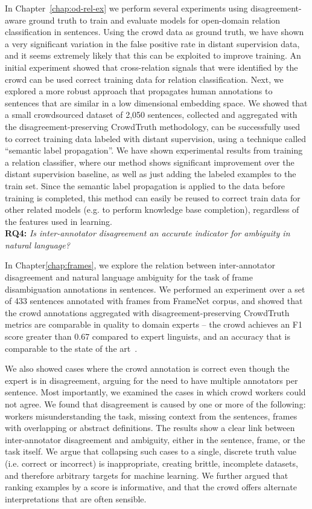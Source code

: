 In Chapter~\ref{chap:od-rel-ex} we perform several experiments using disagreement-aware ground truth to train and evaluate models for open-domain relation classification in sentences. Using the crowd data as ground truth, we have shown a very significant variation in the false positive rate in distant supervision data, and it seems extremely likely that this can be exploited to improve training. An initial experiment showed that cross-relation signals that were identified by the crowd can be used correct training data for relation classification. Next, we explored a more robust approach that propagates human annotations to sentences that are similar in a low dimensional embedding space. We showed that a small crowdsourced dataset of 2,050 sentences, collected and aggregated with the disagreement-preserving CrowdTruth methodology, can be successfully used to correct training data labeled with distant supervision, using a technique called ``semantic label propagation''.  We have shown experimental results from training a relation classifier, where our method shows significant improvement over the distant supervision baseline, as well as just adding the labeled examples to the train set. Since the semantic label propagation is applied to the data before training is completed, this method can easily be reused to correct train data for other related models (e.g. to perform knowledge base completion), regardless of the features used in learning. \\


\textbf{RQ4:} \textit{Is inter-annotator disagreement an accurate indicator for ambiguity in natural language?}

In Chapter\ref{chap:frames}, we explore the relation between inter-annotator disagreement and natural language ambiguity for the task of frame disambiguation annotations in sentences. We performed an experiment over a set of 433 sentences annotated with frames from FrameNet corpus, and showed that the crowd annotations aggregated with disagreement-preserving CrowdTruth metrics are comparable in quality to domain experts -- the crowd achieves an F1 score greater than 0.67 compared to expert linguists, and an accuracy that is comparable to the state of the art~\cite{Hong:2011:GCR:2018966.2018970}.

We also showed cases where the crowd annotation is correct even though the expert is in disagreement, arguing for the need to have multiple annotators per sentence. Most importantly, we examined the cases in which crowd workers could not agree. We found that disagreement is caused by one or more of the following: workers misunderstanding the task, missing context from the sentences, frames with overlapping or abstract definitions. The results show a clear link between inter-annotator disagreement and ambiguity, either in the sentence, frame, or the task itself. We argue that collapsing such cases to a single, discrete truth value (i.e. correct or incorrect) is inappropriate, creating brittle, incomplete datasets, and therefore arbitrary targets for machine learning.  We further argued that ranking examples by a score is informative, and that the crowd offers alternate interpretations that are often sensible.


